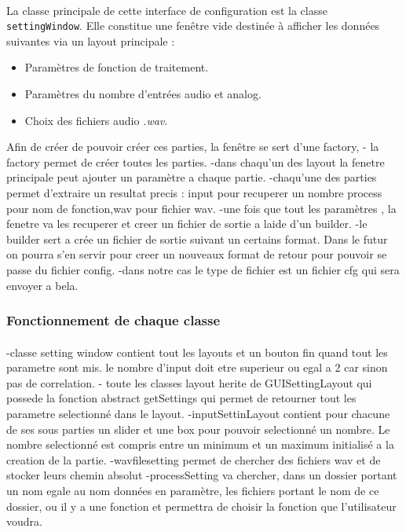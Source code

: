  \paragraph{}
 La classe principale de cette interface de configuration est la
 classe \verb!settingWindow!. Elle constitue une fenêtre vide
 destinée à afficher les données suivantes via un layout principale :
 \begin{itemize}
  \item Paramètres de fonction de traitement.
  \item Paramètres du nombre d'entrées audio et analog.
  \item Choix des fichiers audio \textit{.wav}.
 \end{itemize}
 Afin de créer de pouvoir créer ces parties, la fenêtre se sert d'une factory,
 - la factory permet de créer toutes les parties.
 -dans chaqu'un des layout la fenetre principale peut ajouter un paramètre a chaque
 partie.
 -chaqu'une des parties permet d'extraire un resultat precis : input pour recuperer un nombre
 process pour nom de fonction,wav pour fichier wav.
 -une fois que tout les paramètres , la fenetre va les recuperer et creer un
 fichier de sortie a laide d'un builder.
 -le builder sert a crée un fichier de sortie suivant un certains format. Dans le
 futur on pourra s'en servir pour creer un nouveaux format de retour pour pouvoir
 se passe du fichier config.
 -dans notre cas le type de fichier est un fichier cfg qui sera envoyer a bela.

 \subsubsection{Fonctionnement de chaque classe}
 \paragraph{}
 -classe setting window contient tout les layouts et un bouton fin quand tout les
 parametre sont mis. le nombre d'input doit etre superieur ou egal a 2 car sinon pas de
 correlation.
 - toute les classes layout herite de GUISettingLayout qui possede la fonction
 abstract getSettings qui permet de retourner tout les parametre selectionné dans le layout.
 -inputSettinLayout contient pour chacune de ses sous parties un slider et une box
 pour pouvoir selectionné un nombre. Le nombre selectionné est compris entre un
 minimum et un maximum initialisé a la creation de la partie.
 -wavfilesetting permet de chercher des fichiers wav et de stocker leurs chemin
 absolut
 -processSetting va chercher, dans un dossier portant un nom egale au nom données
 en paramètre, les fichiers portant le nom de ce dossier, ou il y a une fonction
 et permettra de choisir la fonction que l'utilisateur voudra.



